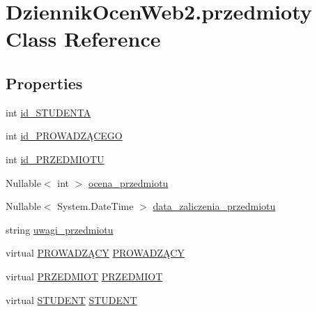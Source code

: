 \hypertarget{class_dziennik_ocen_web2_1_1przedmioty}{}\section{Dziennik\+Ocen\+Web2.\+przedmioty Class Reference}
\label{class_dziennik_ocen_web2_1_1przedmioty}
\subsection*{Properties}
\begin{DoxyCompactItemize}
\item 
int \hyperlink{class_dziennik_ocen_web2_1_1przedmioty_aaac5c87ba59e5ab51584f48dcc347ae5}{id\+\_\+\+S\+T\+U\+D\+E\+N\+TA}
\item 
int \hyperlink{class_dziennik_ocen_web2_1_1przedmioty_add5bd4189bde76c7e37fcb331c1c444f}{id\+\_\+\+P\+R\+O\+W\+A\+D\+ZĄ\+C\+E\+GO}
\item 
int \hyperlink{class_dziennik_ocen_web2_1_1przedmioty_ae2f20c9c93c503b00bf21f10ffbafd97}{id\+\_\+\+P\+R\+Z\+E\+D\+M\+I\+O\+TU}
\item 
Nullable$<$ int $>$ \hyperlink{class_dziennik_ocen_web2_1_1przedmioty_a09432041ce2336c792cb4abd48e25f6f}{ocena\+\_\+przedmiotu}
\item 
Nullable$<$ System.\+Date\+Time $>$ \hyperlink{class_dziennik_ocen_web2_1_1przedmioty_acc9db71323eccba1138d01039a97a78c}{data\+\_\+zaliczenia\+\_\+przedmiotu}
\item 
string \hyperlink{class_dziennik_ocen_web2_1_1przedmioty_a9aff27742101e8a30b3f8dad27f08dcb}{uwagi\+\_\+przedmiotu}
\item 
virtual \hyperlink{class_dziennik_ocen_web2_1_1_p_r_o_w_a_d_z_xC4_x84_c_y}{P\+R\+O\+W\+A\+D\+ZĄ\+CY} \hyperlink{class_dziennik_ocen_web2_1_1przedmioty_abf6b7fd243f3588be07af57dc0c01b54}{P\+R\+O\+W\+A\+D\+ZĄ\+CY}
\item 
virtual \hyperlink{class_dziennik_ocen_web2_1_1_p_r_z_e_d_m_i_o_t}{P\+R\+Z\+E\+D\+M\+I\+OT} \hyperlink{class_dziennik_ocen_web2_1_1przedmioty_a074e696a37d1607355d88fffc6730c7b}{P\+R\+Z\+E\+D\+M\+I\+OT}
\item 
virtual \hyperlink{class_dziennik_ocen_web2_1_1_s_t_u_d_e_n_t}{S\+T\+U\+D\+E\+NT} \hyperlink{class_dziennik_ocen_web2_1_1przedmioty_a8e741dde360736d51f6a3c49728762bb}{S\+T\+U\+D\+E\+NT}
\end{DoxyCompactItemize}


